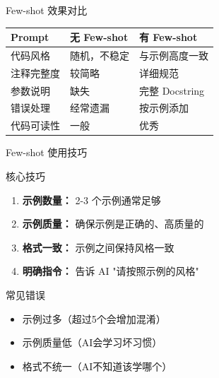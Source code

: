 \begin{frame}{Few-shot 效果对比}
	\begin{table}
		\centering
		\scriptsize
		\begin{tabular}{p{2.5cm}p{3.5cm}p{3.5cm}}
			\toprule
			\textbf{Prompt} & \textbf{无 Few-shot} & \textbf{有 Few-shot} \\
			\midrule
			代码风格 & 随机，不稳定 & 与示例高度一致 \\
			注释完整度 & 较简略 & 详细规范 \\
			参数说明 & 缺失 & 完整 Docstring \\
			错误处理 & 经常遗漏 & 按示例添加 \\
			代码可读性 & 一般 & 优秀 \\
			\bottomrule
		\end{tabular}
	\end{table}
\end{frame}

\begin{frame}{Few-shot 使用技巧}
	\begin{block}{核心技巧}
		\begin{enumerate}
			\item \textbf{示例数量：} 2-3 个示例通常足够
			\item \textbf{示例质量：} 确保示例是正确的、高质量的
			\item \textbf{格式一致：} 示例之间保持风格一致
			\item \textbf{明确指令：} 告诉 AI "请按照示例的风格"
		\end{enumerate}
	\end{block}

	\vspace{0.3cm}

	\begin{alertblock}{常见错误}
		\begin{itemize}
			\item 示例过多（超过5个会增加混淆）
			\item 示例质量低（AI会学习坏习惯）
			\item 格式不统一（AI不知道该学哪个）
		\end{itemize}
	\end{alertblock}
\end{frame}


